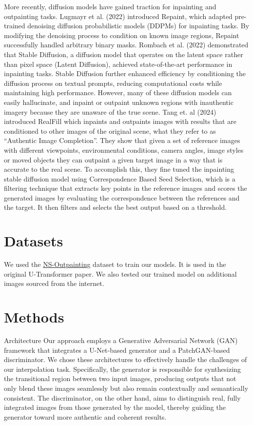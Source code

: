 \documentclass[sigconf]{acmart}
\begin{document}
More recently, diffusion models have gained traction for inpainting and outpainting tasks. Lugmayr et al. (2022) introduced Repaint, which adapted pre-trained denoising diffusion probabilistic models (DDPMs) for inpainting tasks. By modifying the denoising process to condition on known image regions, Repaint successfully handled arbitrary binary masks. Rombach et al. (2022) demonstrated that Stable Diffusion, a diffusion model that operates on the latent space rather than pixel space (Latent Diffusion), achieved state-of-the-art performance in inpainting tasks. Stable Diffusion further enhanced efficiency by conditioning the diffusion process on textual prompts, reducing computational costs while maintaining high performance. However, many of these diffusion models can easily hallucinate, and inpaint or outpaint unknown regions with inauthentic imagery because they are unaware of the true scene. Tang et. al (2024) introduced RealFill which inpaints and outpaints images with results that are conditioned to other images of the original scene, what they refer to as “Authentic Image Completion”. They show that given a set of reference images with different viewpoints, environmental conditions, camera angles, image styles or moved objects they can outpaint a given target image in a way that is accurate to the real scene. To accomplish this, they fine tuned the inpainting stable diffusion model using Correspondence Based Seed Selection, which is a filtering technique that extracts key points in the reference images and scores the generated images by evaluating the correspondence between the references and the target. It then filters and selects the best output based on a threshold.

\section*{Datasets}
We used the \textcolor{red}{\href{https://github.com/z-x-yang/NS-Outpainting}{NS-Outpainting}} dataset to train our models. It is used in the original U-Transformer paper. We also tested our trained model on additional images sourced from the internet.

\section*{Methods}
Architecture
Our approach employs a Generative Adversarial Network (GAN) framework that integrates a U-Net-based generator and a PatchGAN-based discriminator. We chose these architectures to effectively handle the challenges of our interpolation task. Specifically, the generator is responsible for synthesizing the transitional region between two input images, producing outputs that not only blend these images seamlessly but also remain contextually and semantically consistent. The discriminator, on the other hand, aims to distinguish real, fully integrated images from those generated by the model, thereby guiding the generator toward more authentic and coherent results.
\end{document}
